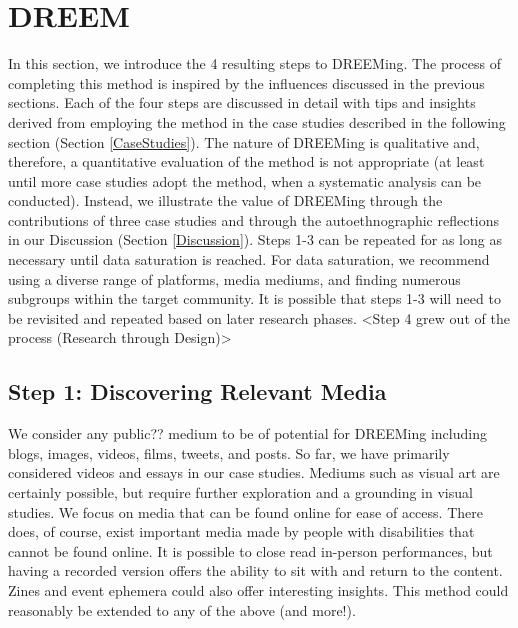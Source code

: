 

  
\section{DREEM} \label{DREEM}
In this section, we introduce the 4 resulting steps to DREEMing. The process of completing this method is inspired by the influences discussed in the previous sections. Each of the four steps are discussed in detail with tips and insights derived from employing the method in the case studies described in the following section (Section \ref{CaseStudies}). The nature of DREEMing is qualitative and, therefore, a quantitative evaluation of the method is not appropriate (at least until more case studies adopt the method, when a systematic analysis can be conducted). Instead, we illustrate the value of DREEMing through the contributions of {\color{red}three} case studies and through the autoethnographic reflections \cite{ramboAutoethnography2020} in our Discussion (Section \ref{Discussion}). Steps 1-3 can be repeated for as long as necessary until data saturation is reached. For data saturation, we recommend using a diverse range of platforms, media mediums, and finding numerous subgroups within the target community.  It is possible that steps 1-3 will need to be revisited and repeated based on later research phases. 
{\color{red}<Step 4 grew out of the process (Research through Design)>}

\subsection{Step 1: Discovering Relevant Media}
We consider any {\color{red}public??} medium to be of potential for DREEMing including blogs, images, videos, films, tweets, and posts. So far, we have primarily considered {\color{red}videos and essays} in our case studies. Mediums such as visual art are certainly possible, but require further exploration and a grounding in visual studies.  We focus on media that can be found online for ease of access. There does, of course, exist important media made by people with disabilities that cannot be found online. It is possible to close read in-person performances, but having a recorded version offers the ability to sit with and return to the content. Zines and event ephemera could also offer interesting insights. This method could reasonably be extended to any of the above (and more!).

